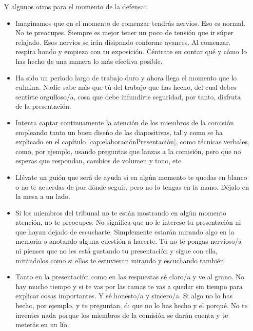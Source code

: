 Y algunos otros para el momento de la defensa:

\begin{itemize}
    \item Imaginamos que en el momento de comenzar tendrás nervios. Eso es normal. No te preocupes. Siempre es mejor tener un poco de tensión que ir súper relajado. Esos nervios se irán disipando conforme avances. Al comenzar, respira hondo y empieza con tu exposición. Céntrate en contar qué y cómo lo has hecho de una manera lo más efectiva posible.

    \item Ha sido un periodo largo de trabajo duro y ahora llega el momento que lo culmina. Nadie sabe más que tú del trabajo que has hecho, del cual debes sentirte orgulloso/a, cosa que debe infundirte seguridad, por tanto, disfruta de la presentación. 

    \item Intenta captar continuamente la atención de los miembros de la comisión empleando tanto un buen diseño de las diapositivas, tal y como se ha explicado en el capítulo \ref{cap:elaboraciónPresentación}, como técnicas verbales, como, por ejemplo, usando preguntas que lanzas a la comisión, pero que no esperas que respondan, cambios de volumen y tono, etc.

    \item Llévate un guión que será de ayuda si en algún momento te quedas en blanco o no te acuerdas de por dónde seguir, pero no lo tengas en la mano. Déjalo en la mesa a un lado.

    \item Si los miembros del tribunal no te están mostrando en algún momento atención, no te preocupes. No significa que no le interese tu presentación ni que hayan dejado de escucharte. Simplemente estarán mirando algo en la memoria o anotando alguna cuestión a hacerte. Tú no te pongas nervioso/a ni pienses que no les está gustando tu presentación y sigue con ella, mirándolos como si ellos te estuvieran mirando y escuchando también.

    \item Tanto en la presentación como en las respuestas sé claro/a y ve al grano. No hay mucho tiempo y si te vas por las ramas te vas a quedar sin tiempo para explicar cosas importantes. Y sé honesto/a y sincero/a. Si algo no lo has hecho, por ejemplo, y te preguntan, di que no lo has hecho y el porqué. No te inventes nada porque los miembros de la comisión se darán cuenta y te meterás en un lío. 


\end{itemize}
